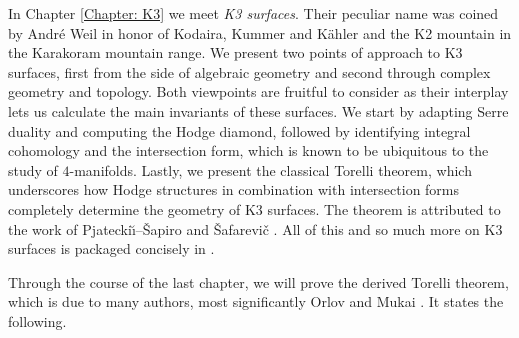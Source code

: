 







In Chapter \ref{Chapter: K3} we meet \emph{K3 surfaces}. Their peculiar name was coined by André Weil in honor of Kodaira, Kummer and Kähler and the K2 mountain in the Karakoram mountain range.
We present two points of approach to K3 surfaces, first from the side of algebraic geometry and second through complex geometry and topology. Both viewpoints are fruitful to consider as their interplay lets us calculate the main invariants of these surfaces. We start by adapting Serre duality and computing the Hodge diamond, followed by identifying integral cohomology and the intersection form, which is known to be ubiquitous to the study of $4$-manifolds. Lastly, we present the classical Torelli theorem, which underscores how Hodge structures in combination with intersection forms completely determine the geometry of K3 surfaces. The theorem is attributed to the work of Pjatecki\u{\i}--Šapiro and Šafarevič \cite{PjateckiiShafarevich1971}. All of this and so much more on K3 surfaces is packaged concisely in \cite{Huybrechts2016}. 




Through the course of the last chapter, we will prove the derived Torelli theorem, which is due to many authors, most significantly Orlov \cite{Orlov2003} and Mukai \cite{Mukai1987}.
It states the following.

